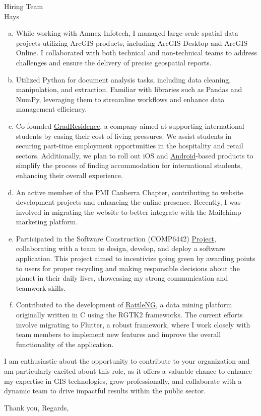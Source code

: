 \documentclass{letter}
\begin{document}
\begin{letter}{Hiring Team\\Hays}
\begin{enumerate}[(a)]
    \item While working with Amnex Infotech, I managed large-scale spatial data projects utilizing ArcGIS products, including ArcGIS Desktop and ArcGIS Online. I collaborated with both technical and non-technical teams to address challenges and ensure the delivery of precise geospatial reports.
    \item Utilized Python for document analysis tasks, including data cleaning, manipulation, and extraction. Familiar with libraries such as Pandas and NumPy, leveraging them to streamline workflows and enhance data management efficiency.
    \item Co-founded \href{https://gradresidence.com/}{GradResidence}, a company aimed at supporting international students by easing their cost of living pressures. We assist students in securing part-time employment opportunities in the hospitality and retail sectors. Additionally, we plan to roll out iOS and \href{https://github.com/gradresidence/android}{Android}-based products to simplify the process of finding accommodation for international students, enhancing their overall experience.
    \item An active member of the PMI Canberra Chapter, contributing to website development projects and enhancing the online presence. Recently, I was involved in migrating the website to better integrate with the Mailchimp marketing platform.
    \item Participated in the Software Construction (COMP6442) \href{https://gitlab.cecs.anu.edu.au/u7544253/ga-23s1-comp2100-6442}{Project}, collaborating with a team to design, develop, and deploy a software application. This project aimed to incentivize going green by awarding points to users for proper recycling and making responsible decisions about the planet in their daily lives, showcasing my strong communication and teamwork skills.
    \item Contributed to the development of \href{https://github.com/gjwgit/rattleng}{RattleNG}, a data mining platform originally written in C using the RGTK2 frameworks. The current efforts involve migrating to Flutter, a robust framework, where I work closely with team members to implement new features and improve the overall functionality of the application.
\end{enumerate}

I am enthusiastic about the opportunity to contribute to your organization and am particularly excited about this role, as it offers a valuable chance to enhance my expertise in GIS technologies, grow professionally, and collaborate with a dynamic team to drive impactful results within the public sector.

\closing{Thank you, Regards,}
\end{letter}
\end{document}
